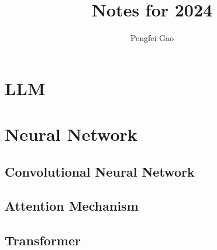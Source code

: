 \documentclass[12pt]{report}
\begin{document}
\title{Notes for 2024}
\author{Pengfei Gao}
\maketitle
\tableofcontents

\section{LLM}

\section{Neural Network}
\subsection{Convolutional Neural Network}
\subsection{Attention Mechanism}
\subsection{Transformer}
\end{document}
